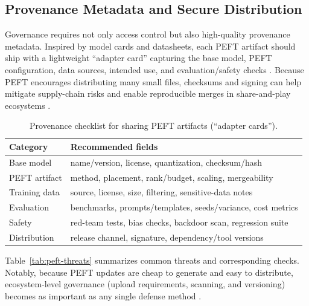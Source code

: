 \documentclass[conference]{IEEEtran}
\begin{document}
\subsection{Provenance Metadata and Secure Distribution}
Governance requires not only access control but also high-quality provenance metadata. Inspired by model cards and datasheets, each PEFT artifact should ship with a lightweight ``adapter card'' capturing the base model, PEFT configuration, data sources, intended use, and evaluation/safety checks \cite{mitchell2018model,gebru2018datasheets}. Because PEFT encourages distributing many small files, checksums and signing can help mitigate supply-chain risks and enable reproducible merges in share-and-play ecosystems \cite{pfeiffer2020adapterhub,liu2024loratk}.

\begin{table}[t]
    \centering
    \caption{Provenance checklist for sharing PEFT artifacts (``adapter cards'').}
    \label{tab:peft-provenance}
    \scriptsize
    \setlength{\tabcolsep}{3pt}
    \begin{tabular}{p{1.55cm}p{5.65cm}}
        \toprule
        \textbf{Category} & \textbf{Recommended fields} \\
        \midrule
        Base model & name/version, license, quantization, checksum/hash \\
        PEFT artifact & method, placement, rank/budget, scaling, mergeability \\
        Training data & source, license, size, filtering, sensitive-data notes \\
        Evaluation & benchmarks, prompts/templates, seeds/variance, cost metrics \\
        Safety & red-team tests, bias checks, backdoor scan, regression suite \\
        Distribution & release channel, signature, dependency/tool versions \\
        \bottomrule
    \end{tabular}
\end{table}

Table~\ref{tab:peft-threats} summarizes common threats and corresponding checks. Notably, because PEFT updates are cheap to generate and easy to distribute, ecosystem-level governance (upload requirements, scanning, and versioning) becomes as important as any single defense method \cite{taraghi2025efficiency,liu2024loratk}.
\end{document}
